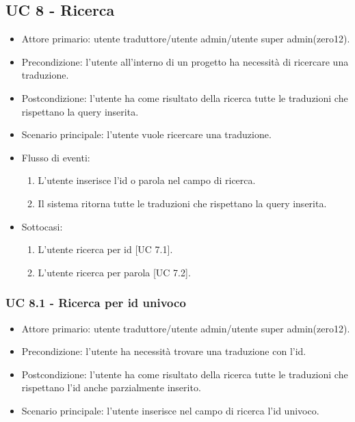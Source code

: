 \subsection{UC 8 - Ricerca}
    \begin{itemize}
        \item Attore primario: utente traduttore/utente admin/utente super admin(zero12).
        \item Precondizione: l'utente all'interno di un progetto ha necessità di ricercare una traduzione.
        \item Postcondizione: l'utente ha come risultato della ricerca tutte le traduzioni che rispettano la query inserita.
        \item Scenario principale: l'utente vuole ricercare una traduzione.
        \item Flusso di eventi:
            \begin{enumerate}
                \item L'utente inserisce l'id o parola nel campo di ricerca.
                \item Il sistema ritorna tutte le traduzioni che rispettano la query inserita.
            \end{enumerate}
        \item Sottocasi:
                \begin{enumerate}
                    \item L'utente ricerca per id [UC 7.1].
                    \item L'utente ricerca per parola [UC 7.2].
                \end{enumerate}
    \end{itemize}
    \subsubsection{UC 8.1 - Ricerca per id univoco}%
        \begin{itemize}
            \item Attore primario: utente traduttore/utente admin/utente super admin(zero12).
            \item Precondizione: l'utente ha necessità trovare una traduzione con l'id.
            \item Postcondizione: l'utente ha come risultato della ricerca tutte le traduzioni che rispettano l'id anche parzialmente inserito.%
            \item Scenario principale: l'utente inserisce nel campo di ricerca l'id univoco.
        \end{itemize}
